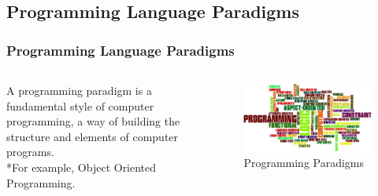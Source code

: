 \documentclass[hideothersubsections, t, aspectratio=1610]{beamer}
\begin{document}
\subsection{Programming Language Paradigms}
\begin{frame}
\frametitle{Programming Language Paradigms}
  \begin{columns}[T]
    \begin{column}{.4\textwidth}
     \begin{block}{}
A programming paradigm is a fundamental style of computer programming, a way of building the structure and elements of computer programs.
\\*For example, Object Oriented Programming.
    \end{block}
    \end{column}
    \begin{column}{.6\textwidth}
    \begin{block}{}
\begin{figure}
    \includegraphics[width=1\textwidth]{programminglanguageparadigms.jpg} 
    \caption{Programming Paradigms}
 \end{figure}   
    \end{block}
    \end{column}
  \end{columns}
\end{frame}
\end{document}
